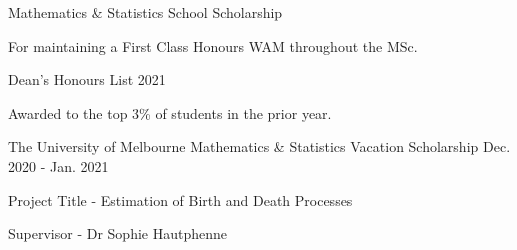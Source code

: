 



\begin{cvhonors}


    {Mathematics \& Statistics School Scholarship}{}{}{
    \begin{cvitems}
      \item  For maintaining a First Class Honours WAM throughout the MSc.
    \end{cvitems}
   }

    {Dean's Honours List 2021}{}{}{
    \begin{cvitems}
      \item  Awarded to the top 3\% of students in the prior year.
    \end{cvitems}
   }
    
  \cventry
    {The University of Melbourne} %
    {Mathematics \& Statistics Vacation Scholarship} %
    {} %
    {Dec. 2020 - Jan. 2021} %
    {
      \begin{cvitems} %
        \item {Project Title - Estimation of Birth and Death Processes}
        \item {Supervisor - Dr Sophie Hautphenne}
      \end{cvitems}
    }




\end{cvhonors}
